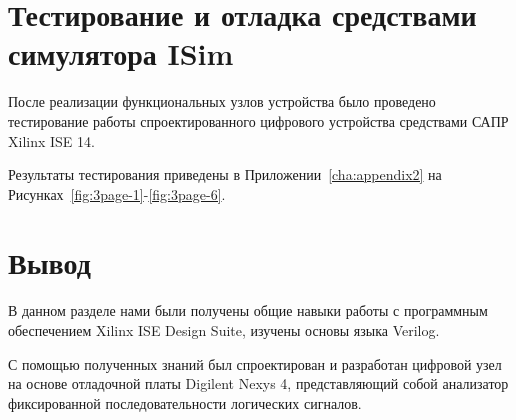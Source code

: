 \section{Тестирование и отладка средствами симулятора ISim}

После реализации функциональных узлов устройства было проведено тестирование работы спроектированного цифрового устройства средствами САПР Xilinx ISE 14. 

Результаты тестирования приведены в Приложении~\ref{cha:appendix2} на Рисунках~\ref{fig:3page-1}-\ref{fig:3page-6}.



\section{Вывод}
В данном разделе нами были получены общие навыки работы с программным обеспечением Xilinx ISE Design Suite, изучены основы языка Verilog.

С помощью полученных знаний был спроектирован и разработан цифровой узел на основе отладочной платы Digilent Nexys 4, представляющий собой анализатор фиксированной последовательности логических
сигналов. 


